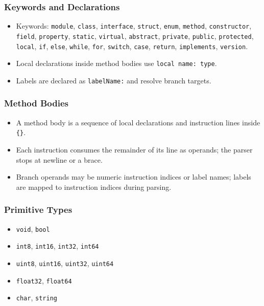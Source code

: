 \documentclass[11pt,a4paper]{article}
\begin{document}
	\subsubsection{Keywords and Declarations}
	\begin{itemize}
		\item Keywords: \texttt{module}, \texttt{class}, \texttt{interface}, \texttt{struct}, \texttt{enum}, \texttt{method}, \texttt{constructor}, \texttt{field}, \texttt{property}, \texttt{static}, \texttt{virtual}, \texttt{abstract}, \texttt{private}, \texttt{public}, \texttt{protected}, \texttt{local}, \texttt{if}, \texttt{else}, \texttt{while}, \texttt{for}, \texttt{switch}, \texttt{case}, \texttt{return}, \texttt{implements}, \texttt{version}.
		\item Local declarations inside method bodies use \texttt{local name: type}.
		\item Labels are declared as \texttt{labelName:} and resolve branch targets.
	\end{itemize}
	
	\subsubsection{Method Bodies}
	\begin{itemize}
		\item A method body is a sequence of local declarations and instruction lines inside \texttt{\{\}}.
		\item Each instruction consumes the remainder of its line as operands; the parser stops at newline or a brace.
		\item Branch operands may be numeric instruction indices or label names; labels are mapped to instruction indices during parsing.
	\end{itemize}
	
	\subsubsection{Primitive Types}
	\begin{itemize}
		\item \texttt{void}, \texttt{bool}
		\item \texttt{int8}, \texttt{int16}, \texttt{int32}, \texttt{int64}
		\item \texttt{uint8}, \texttt{uint16}, \texttt{uint32}, \texttt{uint64}
		\item \texttt{float32}, \texttt{float64}
		\item \texttt{char}, \texttt{string}
	\end{itemize}
	
\end{document}

